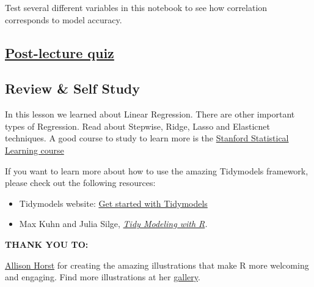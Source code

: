 \documentclass[
]{article}
\begin{document}
Test several different variables in this notebook to see how correlation
corresponds to model accuracy.

\hypertarget{post-lecture-quiz}{%
\subsection{\texorpdfstring{\href{https://white-water-09ec41f0f.azurestaticapps.net/quiz/14/}{\textbf{Post-lecture
quiz}}}{Post-lecture quiz}}\label{post-lecture-quiz}}

\hypertarget{review-self-study}{%
\subsection{\texorpdfstring{\textbf{Review \& Self
Study}}{Review \& Self Study}}\label{review-self-study}}

In this lesson we learned about Linear Regression. There are other
important types of Regression. Read about Stepwise, Ridge, Lasso and
Elasticnet techniques. A good course to study to learn more is the
\href{https://online.stanford.edu/courses/sohs-ystatslearning-statistical-learning}{Stanford
Statistical Learning course}

If you want to learn more about how to use the amazing Tidymodels
framework, please check out the following resources:

\begin{itemize}
\item
  Tidymodels website: \href{https://www.tidymodels.org/start/}{Get
  started with Tidymodels}
\item
  Max Kuhn and Julia Silge, \href{https://www.tmwr.org/}{\emph{Tidy
  Modeling with R}}\emph{.}
\end{itemize}

\textbf{THANK YOU TO:}

\href{https://twitter.com/allison_horst?lang=en}{Allison Horst} for
creating the amazing illustrations that make R more welcoming and
engaging. Find more illustrations at her
\href{https://www.google.com/url?q=https://github.com/allisonhorst/stats-illustrations\&sa=D\&source=editors\&ust=1626380772530000\&usg=AOvVaw3zcfyCizFQZpkSLzxiiQEM}{gallery}.
\end{document}

